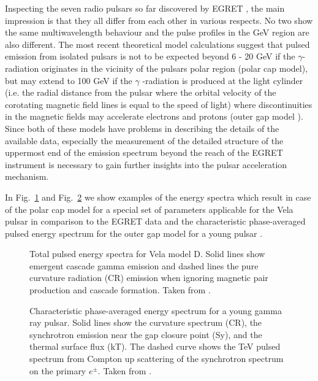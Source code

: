 Inspecting the seven radio pulsars so far discovered by EGRET
\cite{thompson:95,thompson:96,kanbach:97}, the main impression is that they all differ
from each other in various respects. No two show the same multiwavelength
behaviour and the pulse profiles in the GeV region are also different. The
most recent theoretical model calculations \cite{daugherty:96} suggest that
pulsed emission from isolated pulsars is not to be expected beyond 6 - 20
GeV if the $\gamma$-radiation originates in the vicinity of the pulsars
polar region (polar cap model), but may extend to 100 GeV if the $\gamma$%
-radiation is produced at the light cylinder (i.e. the radial distance from
the pulsar where the orbital velocity of the corotating magnetic field lines
is equal to the speed of light) where discontinuities in the magnetic fields
may accelerate electrons and protons (outer gap model 
\cite{cheng:86,cheng:86a,chiang:92,romani:95,romani:96}).
Since both of these
models have problems in describing the details of the available data,
especially the measurement of the detailed structure of the uppermost end of
the emission spectrum beyond the reach of the EGRET instrument is necessary
to gain further insights into the pulsar acceleration mechanism. 

In Fig.~\ref{fig-polar} and Fig.~\ref{fig-outer} we show
examples of the energy spectra which result in case of the polar cap model
for a special set of parameters applicable for the Vela pulsar in comparison to the EGRET data
\cite{daugherty:96} and the characteristic phase-averaged
pulsed energy spectrum for the outer gap model 
for a young pulsar \cite{romani:96}. 

\begin{figure} \centering \leavevmode
\epsfxsize=10cm
\caption{\label{fig-polar}
Total pulsed energy spectra for Vela model D. Solid lines show emergent cascade gamma
emission and dashed lines the pure curvature radiation (CR) emission when 
ignoring magnetic pair production and cascade formation. Taken from
\protect\cite{daugherty:96}.}
\end{figure}

\begin{figure} \centering \leavevmode
\epsfxsize=12cm
\caption{\label{fig-outer}
Characteristic phase-averaged energy spectrum for a young gamma ray pulsar.
Solid lines show the curvature spectrum (CR), the synchrotron emission near
the gap closure point (Sy), and the thermal surface flux (kT).
The dashed curve shows the TeV pulsed spectrum from Compton up scattering of the synchrotron spectrum
on the primary $e^{\pm}$. Taken from
\protect\cite{romani:96}.}
\end{figure}

